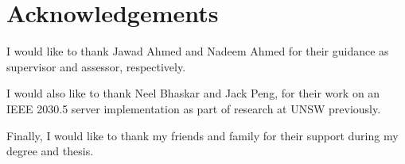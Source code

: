 \chapter*{Acknowledgements}\label{Acknowledgements}
I would like to thank Jawad Ahmed and Nadeem Ahmed for their guidance as supervisor and assessor, respectively.

I would also like to thank Neel Bhaskar and Jack Peng, for their work on an IEEE 2030.5 server implementation as part of research at UNSW previously.

Finally, I would like to thank my friends and family for their support during my degree and thesis.
